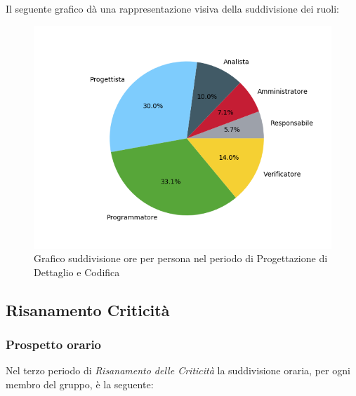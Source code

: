 Il seguente grafico dà una rappresentazione visiva della suddivisione dei ruoli:
\begin{figure}[H]
	\centering
	\includegraphics[width=1\linewidth]{./images/torta_pdc.png}
	\caption{Grafico suddivisione ore per persona nel periodo di Progettazione di Dettaglio e Codifica}
	\label{fig:grafico suddivione ruoli periodo pdc}
\end{figure}

\newpage
\subsection{Risanamento Criticità}
\label{PRC3}

\subsubsection{Prospetto orario}
Nel terzo periodo di \textit{Risanamento delle Criticità} la suddivisione oraria, per ogni membro del gruppo, è la seguente:

